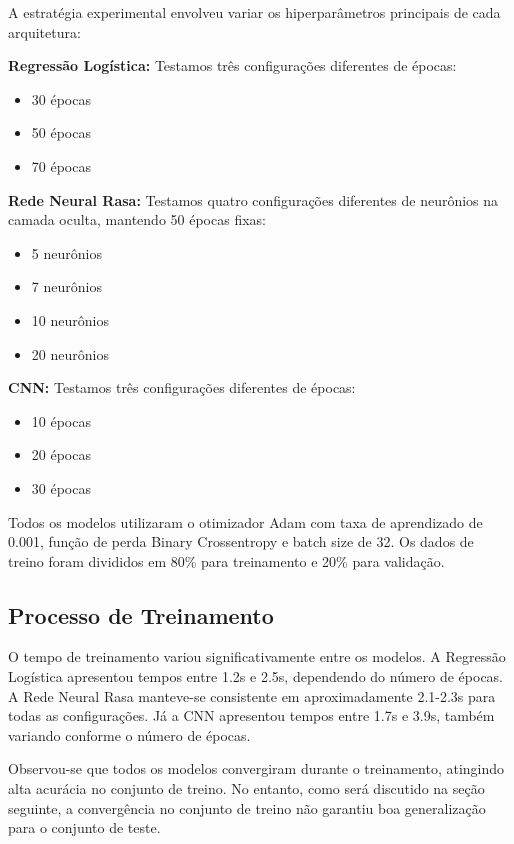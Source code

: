 \documentclass[a4paper,12pt]{article}
\begin{document}
A estratégia experimental envolveu variar os hiperparâmetros principais de cada arquitetura:

\textbf{Regressão Logística:} Testamos três configurações diferentes de épocas:
\begin{itemize}
    \item 30 épocas
    \item 50 épocas
    \item 70 épocas
\end{itemize}

\textbf{Rede Neural Rasa:} Testamos quatro configurações diferentes de neurônios na camada oculta, mantendo 50 épocas fixas:
\begin{itemize}
    \item 5 neurônios
    \item 7 neurônios
    \item 10 neurônios
    \item 20 neurônios
\end{itemize}

\textbf{CNN:} Testamos três configurações diferentes de épocas:
\begin{itemize}
    \item 10 épocas
    \item 20 épocas
    \item 30 épocas
\end{itemize}

Todos os modelos utilizaram o otimizador Adam com taxa de aprendizado de 0.001, função de perda Binary Crossentropy e batch size de 32. Os dados de treino foram divididos em 80\% para treinamento e 20\% para validação.

\subsection{Processo de Treinamento}

O tempo de treinamento variou significativamente entre os modelos. A Regressão Logística apresentou tempos entre 1.2s e 2.5s, dependendo do número de épocas. A Rede Neural Rasa manteve-se consistente em aproximadamente 2.1-2.3s para todas as configurações. Já a CNN apresentou tempos entre 1.7s e 3.9s, também variando conforme o número de épocas.

Observou-se que todos os modelos convergiram durante o treinamento, atingindo alta acurácia no conjunto de treino. No entanto, como será discutido na seção seguinte, a convergência no conjunto de treino não garantiu boa generalização para o conjunto de teste.
\end{document}
